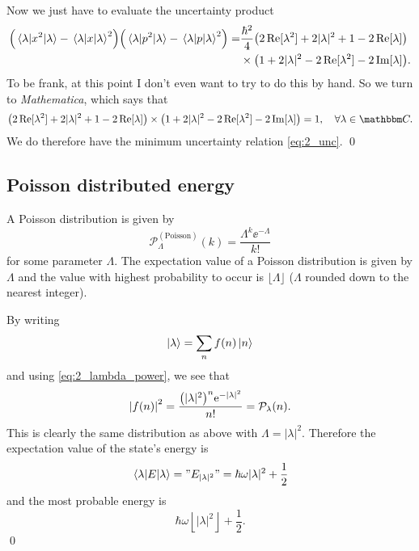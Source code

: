 \documentclass[11pt,letter, swedish, english
]{article}
\begin{document}
Now we just have to evaluate the uncertainty product
\begin{equation}
\begin{aligned}
\qty(\ev{x^2}{\lambda}-\ev{x}{\lambda}^2)
\qty(\ev{p^2}{\lambda}-\ev{p}{\lambda}^2)
=&\frac{\hbar^2}{4}
\qty(2\Re[\lambda^2] + 2|\lambda|^2 + 1 - 2\Re[\lambda])\\
&\times\qty(1+2|\lambda|^2 - 2\Re[\lambda^2]-2\Im[\lambda]).
\end{aligned}
\end{equation}
To be frank, at this point I don't even want to try to do this by
hand. So we turn to \emph{Mathematica}, which
 says that
\begin{equation}
\qty(2\Re[\lambda^2] + 2|\lambda|^2 + 1 - 2\Re[\lambda])
\times\qty(1+2|\lambda|^2 - 2\Re[\lambda^2]-2\Im[\lambda])
=1\qcomma\forall\lambda\in\C.
\end{equation}
We do therefore have the minimum uncertainty relation
\eqref{eq:2_unc}. 
\qed

\subsection{Poisson distributed energy}
A Poisson distribution is given by
\begin{equation}
\mathcal{P}_\Lambda^{(\text{Poisson})}(k)=\frac{\Lambda^k\ee^{-\Lambda}}{k!}
\end{equation}
for some parameter $\Lambda$. The expectation value of a Poisson
distribution is given by $\Lambda$ and the value with highest
probability to occur is $\lfloor\Lambda\rfloor$ ($\Lambda$ rounded
down to the nearest integer).

By writing
\begin{equation}
\ket{\lambda}=\sum_n f(n)\ket{n}
\end{equation}
and using \eqref{eq:2_lambda_power}, we see that
\begin{equation}
\abs{f(n)}^2=\frac{\qty(|\lambda|^2)^n\mathrm{e}^{-|\lambda|^2}}{n!}
=\mathcal{P}_\lambda(n).
\end{equation}
This is clearly the same distribution as above with
$\Lambda=|\lambda|^2$. Therefore the expectation value of the state's
energy is
\begin{equation}
\ev{E}{\lambda}="E_{|\lambda|^2}"=\hbar\omega|\lambda|^2+\frac{1}{2}
\end{equation}
and the most probable energy is
\begin{equation}
\hbar\omega\left\lfloor|\lambda|^2\right\rfloor+\frac{1}{2}.
\end{equation}
\qed
\end{document}
